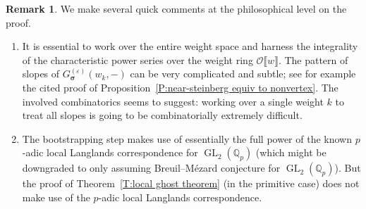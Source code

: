 \documentclass[12pt]{amsart}
\theoremstyle{definition}
\newtheorem{remark}[subsection]{Remark}
\numberwithin{equation}{subsection}
\def\calO{\mathcal{O}}
\def\QQ{\mathbb{Q}}
\DeclareMathOperator{\GL}{GL}
\newcommand{\bbsigma}{\boldsymbol{\sigma}}
\begin{document}
\begin{remark}
We make several quick comments at the philosophical level on the proof.
\begin{enumerate}
\item It is essential to work over the entire weight space and harness the integrality of the characteristic power series over the weight ring $\calO\llbracket w\rrbracket$.  The pattern of slopes of $G_{\bbsigma}^{(\varepsilon)}(w_k, -)$ can be very complicated and subtle; see for example the cited proof of Proposition~\ref{P:near-steinberg equiv to nonvertex}. The involved combinatorics seems to suggest: working over a single weight $k$ to treat all slopes is going to be combinatorially extremely difficult.
\item 
The bootstrapping step makes use of essentially the full power of the known $p$-adic local Langlands correspondence for $\GL_2(\QQ_p)$ (which might be downgraded to only assuming Breuil--M\'ezard conjecture for $\GL_2(\QQ_p)$). But the proof of Theorem~\ref{T:local ghost theorem} (in the primitive case) does not make use of the $p$-adic local Langlands correspondence.
\end{enumerate}
\end{remark}
\end{document}
